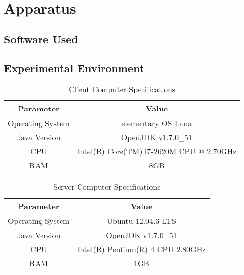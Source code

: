 \documentclass{article}
\begin{document}
\section{Apparatus}

\subsection{Software Used}

\subsection{Experimental Environment}
\begin{table}
    \begin{tabular}{|c|c|}
    \hline
    Parameter        & Value                                    \\ \hline
    Operating System & elementary OS Luna     					\\ \hline
    Java Version     & OpenJDK v1.7.0\_51                       \\ \hline
    CPU              & Intel(R) Core(TM) i7-2620M CPU @ 2.70GHz \\ \hline
    RAM              & 8GB                                      \\ \hline
    \end{tabular}
    \caption {Client Computer Specifications}
\end{table}


\begin{table}
    \begin{tabular}{|c|c|}
    \hline
    Parameter        & Value                                    \\ \hline
    Operating System & Ubuntu 12.04.3 LTS    					\\ \hline
    Java Version     & OpenJDK v1.7.0\_51                       \\ \hline
    CPU              & Intel(R) Pentium(R) 4 CPU 2.80GHz 		\\ \hline
    RAM              & 1GB                                      \\ \hline
    \end{tabular}
    \caption {Server Computer Specifications}
\end{table}

\end{document}
